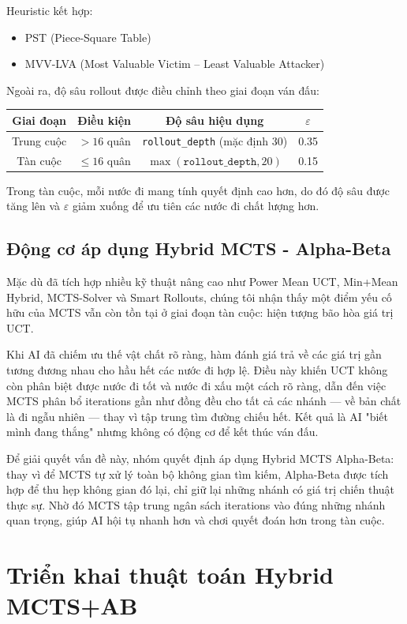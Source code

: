 Heuristic kết hợp:
\begin{itemize}
    \item PST (Piece-Square Table)
    \item MVV-LVA (Most Valuable Victim -- Least Valuable Attacker)
\end{itemize}

Ngoài ra, độ sâu rollout được điều chỉnh theo giai đoạn ván đấu:

\begin{table}[h]
\centering
\begin{tabular}{|c|c|c|c|}
\hline
Giai đoạn & Điều kiện & Độ sâu hiệu dụng & $\varepsilon$ \\
\hline
Trung cuộc & $> 16$ quân & \texttt{rollout\_depth} (mặc định 30) & 0.35 \\
\hline
Tàn cuộc & $\leq 16$ quân & $\max(\texttt{rollout\_depth}, 20)$ & 0.15 \\
\hline
\end{tabular}
\end{table}

Trong tàn cuộc, mỗi nước đi mang tính quyết định cao hơn, do đó độ sâu được tăng lên và $\varepsilon$ giảm xuống để ưu tiên các nước đi chất lượng hơn.
\subsection{Động cơ áp dụng Hybrid MCTS - Alpha-Beta}
Mặc dù đã tích hợp nhiều kỹ thuật nâng cao như Power Mean UCT, Min+Mean Hybrid, MCTS-Solver và Smart Rollouts, chúng tôi nhận thấy một điểm yếu cố hữu của MCTS vẫn còn tồn tại ở giai đoạn tàn cuộc: hiện tượng bão hòa giá trị UCT.

Khi AI đã chiếm ưu thế vật chất rõ ràng, hàm đánh giá trả về các giá trị gần tương đương nhau cho hầu hết các nước đi hợp lệ. Điều này khiến UCT không còn phân biệt được nước đi tốt và nước đi xấu một cách rõ ràng, dẫn đến việc MCTS phân bổ iterations gần như đồng đều cho tất cả các nhánh — về bản chất là đi ngẫu nhiên — thay vì tập trung tìm đường chiếu hết. Kết quả là AI "biết mình đang thắng" nhưng không có động cơ để kết thúc ván đấu.

Để giải quyết vấn đề này, nhóm quyết định áp dụng Hybrid MCTS Alpha-Beta: thay vì để MCTS tự xử lý toàn bộ không gian tìm kiếm, Alpha-Beta được tích hợp để thu hẹp không gian đó lại, chỉ giữ lại những nhánh có giá trị chiến thuật thực sự. Nhờ đó MCTS tập trung ngân sách iterations vào đúng những nhánh quan trọng, giúp AI hội tụ nhanh hơn và chơi quyết đoán hơn trong tàn cuộc.
\section{Triển khai thuật toán Hybrid MCTS+AB}

